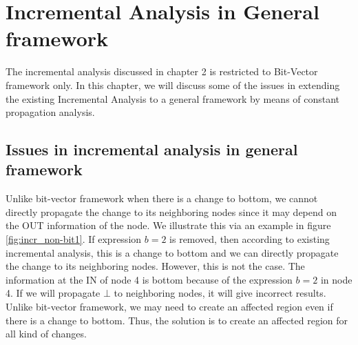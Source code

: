 \documentclass[11pt,a4paper,openright]{report}
\begin{document}
\chapter{Incremental Analysis in General framework}
The incremental analysis discussed in chapter 2 is restricted to Bit-Vector framework only.
In this chapter, we will discuss some of the issues in extending the existing Incremental 
Analysis to a general framework by means of constant propagation analysis.
\section{Issues in incremental analysis in general framework}
Unlike bit-vector framework when there is a change to bottom, we cannot directly propagate
the change to its neighboring nodes since it may depend on the OUT information of the node.
We illustrate this via an example in figure \ref{fig:incr_non-bit1}. If expression $b=2$ is removed,
then according to existing incremental analysis, this is a change to bottom and we can directly propagate
the change to its neighboring nodes. However, this is not the case. 
The information at the IN of node 4 is bottom because of the expression $b=2$ in node 4.
If we will propagate $\bot$ to neighboring nodes, it will give incorrect results.
Unlike bit-vector framework, we may need to create an affected region even if there is a change to bottom.
Thus, the solution is to create an affected region for all kind of changes.
\end{document}
